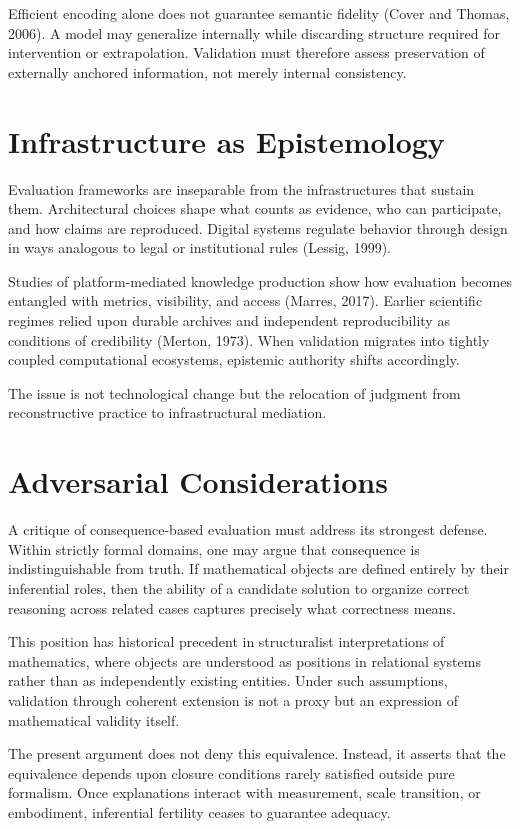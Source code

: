 \documentclass[12pt]{article}
\begin{document}
Efficient encoding alone does not guarantee semantic fidelity (Cover and Thomas, 2006). A model may generalize internally while discarding structure required for intervention or extrapolation. Validation must therefore assess preservation of externally anchored information, not merely internal consistency.

\section{Infrastructure as Epistemology}

Evaluation frameworks are inseparable from the infrastructures that sustain them. Architectural choices shape what counts as evidence, who can participate, and how claims are reproduced. Digital systems regulate behavior through design in ways analogous to legal or institutional rules (Lessig, 1999).

Studies of platform-mediated knowledge production show how evaluation becomes entangled with metrics, visibility, and access (Marres, 2017). Earlier scientific regimes relied upon durable archives and independent reproducibility as conditions of credibility (Merton, 1973). When validation migrates into tightly coupled computational ecosystems, epistemic authority shifts accordingly.

The issue is not technological change but the relocation of judgment from reconstructive practice to infrastructural mediation.

\section{Adversarial Considerations}

A critique of consequence-based evaluation must address its strongest defense. Within strictly formal domains, one may argue that consequence is indistinguishable from truth. If mathematical objects are defined entirely by their inferential roles, then the ability of a candidate solution to organize correct reasoning across related cases captures precisely what correctness means.

This position has historical precedent in structuralist interpretations of mathematics, where objects are understood as positions in relational systems rather than as independently existing entities. Under such assumptions, validation through coherent extension is not a proxy but an expression of mathematical validity itself.

The present argument does not deny this equivalence. Instead, it asserts that the equivalence depends upon closure conditions rarely satisfied outside pure formalism. Once explanations interact with measurement, scale transition, or embodiment, inferential fertility ceases to guarantee adequacy.
\end{document}
